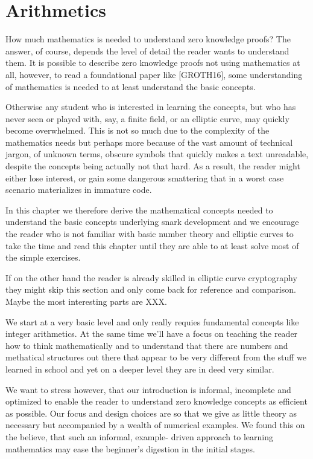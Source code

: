 \chapter{Arithmetics}
How much mathematics is needed to understand zero knowledge proofs? The answer, of course, depends the level of detail the reader wants to understand them. It is possible to describe zero knowledge proofs not using mathematics at all, however, to read a foundational paper like [GROTH16], some understanding of mathematics is needed to at least understand the basic concepts. 

Otherwise any student who is interested in learning the concepts, but who
has never seen or played with, say, a finite field, or an elliptic curve, may quickly become overwhelmed. This is not so much due to the complexity of the mathematics needs but perhaps more because of the vast amount of technical jargon, of unknown terms, obscure symbols that quickly makes a text unreadable, despite the concepts being actually not that hard. As a result, the reader might either lose interest, or gain some dangerous smattering that in a worst case scenario materializes in immature code. 

In this chapter we therefore derive the mathematical concepts needed to understand the basic concepts underlying snark development and we encourage the reader who is not familiar with basic number theory and elliptic curves to take the time and read this chapter until they are able to at least solve most of the simple exercises. 

If on the other hand the reader is already skilled in elliptic curve cryptography they might skip this section and only come back for reference and comparison. Maybe the most interesting parts are XXX.

We start at a very basic level and only really requies fundamental concepts like integer arithmetics. At the same time we'll have a focus on teaching the reader how to think mathematically and to understand that there are numbers and methatical structures out there that appear to be very different from the stuff we learned in school and yet on a deeper level they are in deed very similar.

We want to stress however, that our introduction is informal, incomplete and optimized to enable the reader to understand zero knowledge concepts as efficient as possible. Our focus and design choices are so that we give as little theory as necessary but accompanied by a wealth of numerical examples. We found this on the believe, that such an informal, example-
driven approach to learning mathematics may ease the beginner’s digestion in the initial stages. 


